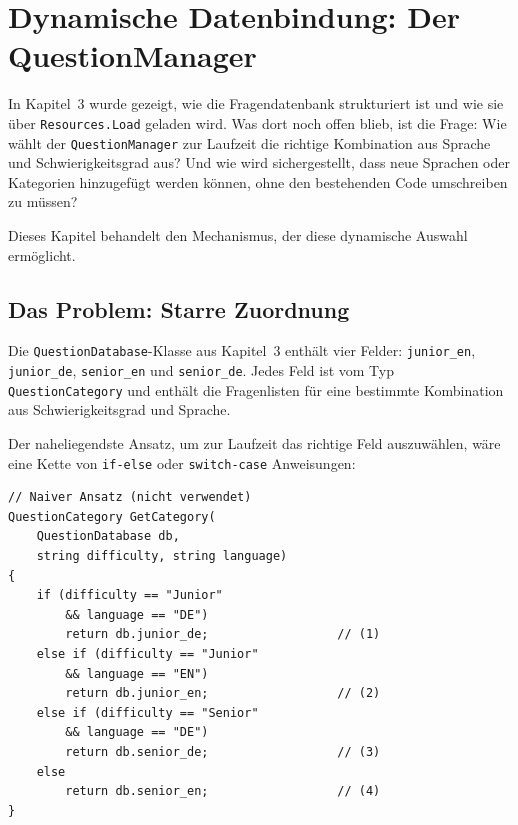 \documentclass[12pt,a4paper]{article}
\begin{document}
%
%

\section{Dynamische Datenbindung: Der QuestionManager}

In Kapitel~3 wurde gezeigt, wie die Fragendatenbank strukturiert ist und wie sie über \texttt{Resources.Load} geladen wird. Was dort noch offen blieb, ist die Frage: Wie wählt der \texttt{QuestionManager} zur Laufzeit die richtige Kombination aus Sprache und Schwierigkeitsgrad aus? Und wie wird sichergestellt, dass neue Sprachen oder Kategorien hinzugefügt werden können, ohne den bestehenden Code umschreiben zu müssen?

Dieses Kapitel behandelt den Mechanismus, der diese dynamische Auswahl ermöglicht.

\subsection{Das Problem: Starre Zuordnung}

Die \texttt{QuestionDatabase}-Klasse aus Kapitel~3 enthält vier Felder: \texttt{junior\_en}, \texttt{junior\_de}, \texttt{senior\_en} und \texttt{senior\_de}. Jedes Feld ist vom Typ \texttt{QuestionCategory} und enthält die Fragenlisten für eine bestimmte Kombination aus Schwierigkeitsgrad und Sprache.

Der naheliegendste Ansatz, um zur Laufzeit das richtige Feld auszuwählen, wäre eine Kette von \texttt{if-else} oder \texttt{switch-case} Anweisungen:

\begin{lstlisting}
// Naiver Ansatz (nicht verwendet)
QuestionCategory GetCategory(
    QuestionDatabase db,
    string difficulty, string language)
{
    if (difficulty == "Junior"
        && language == "DE")
        return db.junior_de;                  // (1)
    else if (difficulty == "Junior"
        && language == "EN")
        return db.junior_en;                  // (2)
    else if (difficulty == "Senior"
        && language == "DE")
        return db.senior_de;                  // (3)
    else
        return db.senior_en;                  // (4)
}
\end{lstlisting}
\end{document}
